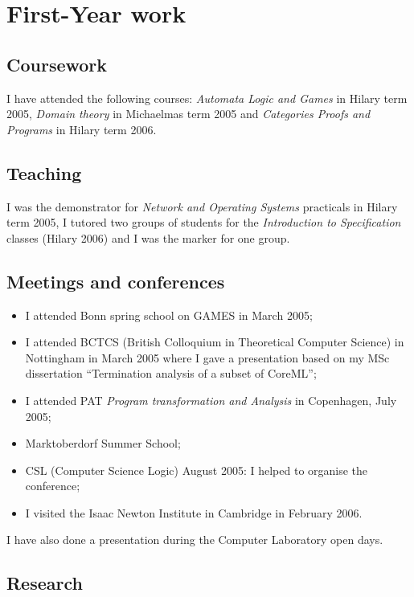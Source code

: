 \chapter*{First-Year work}

\section{Coursework}
I have attended the following courses: \emph{Automata Logic and
Games} in Hilary term 2005, \emph{Domain theory} in Michaelmas term
2005 and \emph{Categories Proofs and Programs} in Hilary term 2006.

\section{Teaching}

I was the demonstrator for \emph{Network and Operating Systems}
practicals in Hilary term 2005, I tutored two groups of students for
the \emph{Introduction to Specification} classes (Hilary 2006) and I
was the marker for one group.

\section{Meetings and conferences}
\begin{itemize}
\item I attended Bonn spring school on GAMES in March 2005;

\item  I attended BCTCS (British Colloquium in
Theoretical Computer Science) in Nottingham in March 2005 where I
gave a presentation based on my MSc dissertation ``Termination
analysis of a subset of CoreML'';

\item I attended PAT \emph{Program transformation and Analysis} in Copenhagen, July 2005;

\item Marktoberdorf Summer School;
\item CSL (Computer Science Logic) August 2005:
I helped to organise the conference;
\item I visited the Isaac Newton Institute in Cambridge in February
2006.
\end{itemize}
I have also done a presentation during the Computer Laboratory open
days.


\section{Research}

